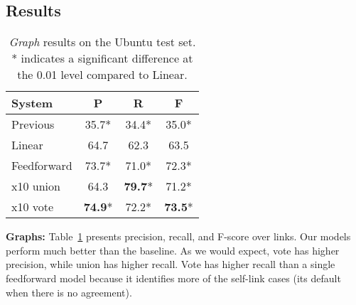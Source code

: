 \documentclass[11pt,a4paper]{article}
\newcommand{\tightparagraph}[1]{\noindent\textbf{#1:}}
\begin{document}
\subsection{Results}

\begin{table}
  \centering
    \setlength{\tabcolsep}{5pt}
  \begin{tabular}{l ccc}
    \toprule
    System                    &           P   &           R      &           F   \\
    \midrule
    Previous                  &         35.7*  &          34.4*  &          35.0*  \\
    Linear                    &         64.7\phantom{*} & 62.3\phantom{*} & 63.5\phantom{*}  \\
    Feedforward               &         73.7*  &          71.0*  &          72.3*   \\
    \phantom{a}x10 union      &         64.3\phantom{*} & \textbf{79.7}*  & 71.2*   \\
    \phantom{a}x10 vote       & \textbf{74.9}* &           72.2* &  \textbf{73.5}*  \\
    \bottomrule
  \end{tabular}
  \caption{\label{tab:res-graph}
  \emph{Graph} results on the Ubuntu test set.
  * indicates a significant difference at the 0.01 level compared to Linear.
  }
\end{table}

\tightparagraph{Graphs}
Table~\ref{tab:res-graph} presents precision, recall, and F-score over links.
Our models perform much better than the baseline.
As we would expect, vote has higher precision, while union has higher recall.
Vote has higher recall than a single feedforward model because it identifies more of the self-link cases (its default when there is no agreement).
\end{document}
